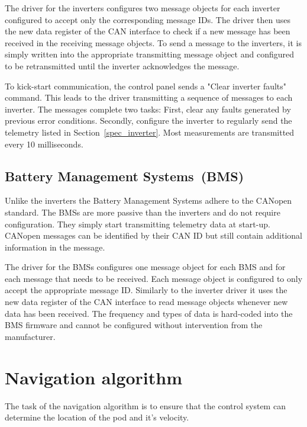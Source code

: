The driver for the inverters configures two message objects for each inverter configured to accept only the corresponding message IDs. The driver then uses the new data register of the CAN interface to check if a new message has been received in the receiving message objects. To send a message to the inverters, it is simply written into the appropriate transmitting message object and configured to be retransmitted until the inverter acknowledges the message.

To kick-start communication, the control panel sends a "Clear inverter faults" command. This leads to the driver transmitting a sequence of messages to each inverter. The messages complete two tasks: First, clear any faults generated by previous error conditions. Secondly, configure the inverter to regularly send the telemetry listed in Section~\ref{spec_inverter}. Most measurements are transmitted every 10 milliseconds.

\subsection{Battery Management Systems (BMS)}

Unlike the inverters the Battery Management Systems adhere to the CANopen standard. The BMSs are more passive than the inverters and do not require configuration. They simply start transmitting telemetry data at start-up. CANopen messages can be identified by their CAN ID but still contain additional information in the message.

The driver for the BMSs configures one message object for each BMS and for each message that needs to be received. Each message object is configured to only accept the appropriate message ID. Similarly to the inverter driver it uses the new data register of the CAN interface to read message objects whenever new data has been received. The frequency and types of data is hard-coded into the BMS firmware and cannot be configured without intervention from the manufacturer.

\section{Navigation algorithm}

The task of the navigation algorithm is to ensure that the control system can determine the location of the pod and it's velocity.

